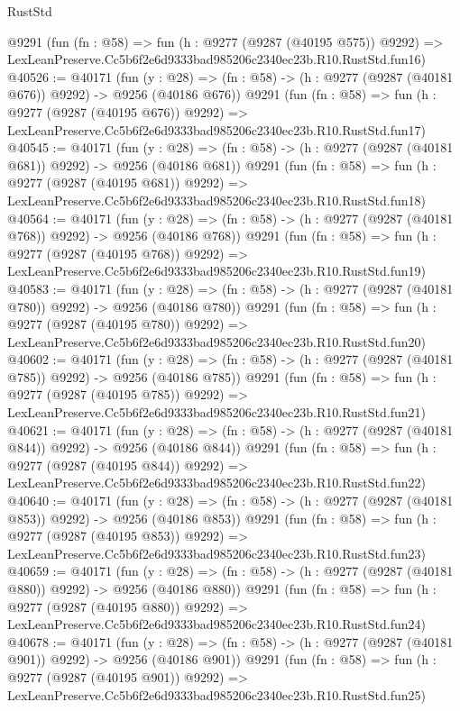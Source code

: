 \begin{lexlean}{RustStd}
\begin{coremodule}
    @9291
    (fun (fn : @58) =>
    fun (h : @9277 (@9287 (@40195 @575)) @9292) =>
    LexLeanPreserve.Cc5b6f2e6d9333bad985206c2340ec23b.R10.RustStd.fun16)
@40526 := @40171
    (fun (y : @28) => (fn : @58) -> (h : @9277 (@9287 (@40181 @676)) @9292) -> @9256 (@40186 @676))
    @9291
    (fun (fn : @58) =>
    fun (h : @9277 (@9287 (@40195 @676)) @9292) =>
    LexLeanPreserve.Cc5b6f2e6d9333bad985206c2340ec23b.R10.RustStd.fun17)
@40545 := @40171
    (fun (y : @28) => (fn : @58) -> (h : @9277 (@9287 (@40181 @681)) @9292) -> @9256 (@40186 @681))
    @9291
    (fun (fn : @58) =>
    fun (h : @9277 (@9287 (@40195 @681)) @9292) =>
    LexLeanPreserve.Cc5b6f2e6d9333bad985206c2340ec23b.R10.RustStd.fun18)
@40564 := @40171
    (fun (y : @28) => (fn : @58) -> (h : @9277 (@9287 (@40181 @768)) @9292) -> @9256 (@40186 @768))
    @9291
    (fun (fn : @58) =>
    fun (h : @9277 (@9287 (@40195 @768)) @9292) =>
    LexLeanPreserve.Cc5b6f2e6d9333bad985206c2340ec23b.R10.RustStd.fun19)
@40583 := @40171
    (fun (y : @28) => (fn : @58) -> (h : @9277 (@9287 (@40181 @780)) @9292) -> @9256 (@40186 @780))
    @9291
    (fun (fn : @58) =>
    fun (h : @9277 (@9287 (@40195 @780)) @9292) =>
    LexLeanPreserve.Cc5b6f2e6d9333bad985206c2340ec23b.R10.RustStd.fun20)
@40602 := @40171
    (fun (y : @28) => (fn : @58) -> (h : @9277 (@9287 (@40181 @785)) @9292) -> @9256 (@40186 @785))
    @9291
    (fun (fn : @58) =>
    fun (h : @9277 (@9287 (@40195 @785)) @9292) =>
    LexLeanPreserve.Cc5b6f2e6d9333bad985206c2340ec23b.R10.RustStd.fun21)
@40621 := @40171
    (fun (y : @28) => (fn : @58) -> (h : @9277 (@9287 (@40181 @844)) @9292) -> @9256 (@40186 @844))
    @9291
    (fun (fn : @58) =>
    fun (h : @9277 (@9287 (@40195 @844)) @9292) =>
    LexLeanPreserve.Cc5b6f2e6d9333bad985206c2340ec23b.R10.RustStd.fun22)
@40640 := @40171
    (fun (y : @28) => (fn : @58) -> (h : @9277 (@9287 (@40181 @853)) @9292) -> @9256 (@40186 @853))
    @9291
    (fun (fn : @58) =>
    fun (h : @9277 (@9287 (@40195 @853)) @9292) =>
    LexLeanPreserve.Cc5b6f2e6d9333bad985206c2340ec23b.R10.RustStd.fun23)
@40659 := @40171
    (fun (y : @28) => (fn : @58) -> (h : @9277 (@9287 (@40181 @880)) @9292) -> @9256 (@40186 @880))
    @9291
    (fun (fn : @58) =>
    fun (h : @9277 (@9287 (@40195 @880)) @9292) =>
    LexLeanPreserve.Cc5b6f2e6d9333bad985206c2340ec23b.R10.RustStd.fun24)
@40678 := @40171
    (fun (y : @28) => (fn : @58) -> (h : @9277 (@9287 (@40181 @901)) @9292) -> @9256 (@40186 @901))
    @9291
    (fun (fn : @58) =>
    fun (h : @9277 (@9287 (@40195 @901)) @9292) =>
    LexLeanPreserve.Cc5b6f2e6d9333bad985206c2340ec23b.R10.RustStd.fun25)

\end{coremodule}
\end{lexlean}
